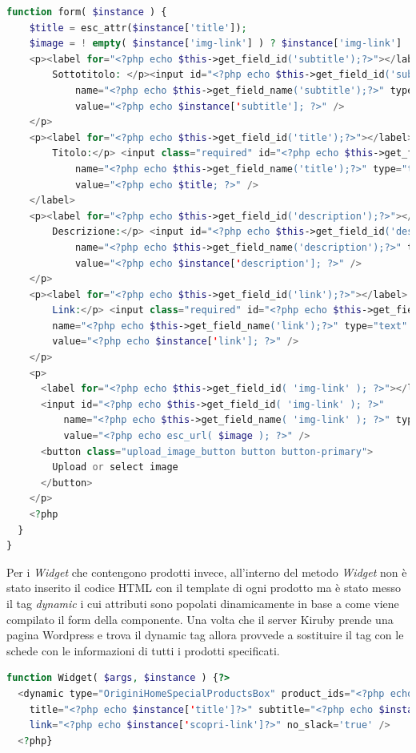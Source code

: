 \begin{lstlisting}[style=customphp, basicstyle=\tiny, language=Php,caption={Codice del Widget \emph{Origini - Speciale}}]
  function form( $instance ) {
    $title = esc_attr($instance['title']);
    $image = ! empty( $instance['img-link'] ) ? $instance['img-link'] : '';?>
    <p><label for="<?php echo $this->get_field_id('subtitle');?>"></label>
        Sottotitolo: </p><input id="<?php echo $this->get_field_id('subtitle');?>" 
        	name="<?php echo $this->get_field_name('subtitle');?>" type="text" 
        	value="<?php echo $instance['subtitle']; ?>" />
    </p>
    <p><label for="<?php echo $this->get_field_id('title');?>"></label>
        Titolo:</p> <input class="required" id="<?php echo $this->get_field_id('title');?>"
        	name="<?php echo $this->get_field_name('title');?>" type="text" 
        	value="<?php echo $title; ?>" />
    </label>
    <p><label for="<?php echo $this->get_field_id('description');?>"></label>
        Descrizione:</p> <input id="<?php echo $this->get_field_id('description');?>" 
        	name="<?php echo $this->get_field_name('description');?>" type="text" 
        	value="<?php echo $instance['description']; ?>" />
    </p>
    <p><label for="<?php echo $this->get_field_id('link');?>"></label>
        Link:</p> <input class="required" id="<?php echo $this->get_field_id('link');?>" 
        name="<?php echo $this->get_field_name('link');?>" type="text" 
        value="<?php echo $instance['link']; ?>" />
    </p>
    <p>
      <label for="<?php echo $this->get_field_id( 'img-link' ); ?>"></label>
      <input id="<?php echo $this->get_field_id( 'img-link' ); ?>" 
	      name="<?php echo $this->get_field_name( 'img-link' ); ?>" type="text" 
	      value="<?php echo esc_url( $image ); ?>" />
      <button class="upload_image_button button button-primary">
      	Upload or select image
      </button>
    </p>
    <?php
  }
}
\end{lstlisting}

Per i \emph{Widget} che contengono prodotti invece, all'interno del metodo \emph{Widget} non è stato inserito il codice HTML con il template
di ogni prodotto ma è stato messo il tag \emph{dynamic} i cui attributi sono popolati dinamicamente in base a come viene compilato il form della componente.
Una volta che il server Kiruby prende una pagina Wordpress e trova il dynamic tag allora provvede a sostituire il tag con le schede con le informazioni
di tutti i prodotti specificati.
\newpage

\begin{lstlisting}[style=customphp, basicstyle=\tiny, language=Php,caption={Il metodo \emph{Widget} di \emph{Origini - Slider prodotti} stampa il dynamic tag che verrà letto da Kiruby e sostituito con l'HTML dei prodotti}] 
function Widget( $args, $instance ) {?>
  <dynamic type="OriginiHomeSpecialProductsBox" product_ids="<?php echo $instance['ids']?>" 
    title="<?php echo $instance['title']?>" subtitle="<?php echo $instance['subtitle']?>" 
    link="<?php echo $instance['scopri-link']?>" no_slack='true' />
  <?php}
\end{lstlisting}\